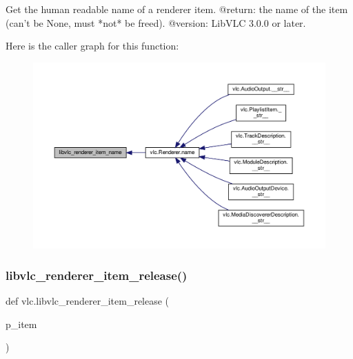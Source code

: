 \begin{DoxyVerb}Get the human readable name of a renderer item.
@return: the name of the item (can't be None, must *not* be freed).
@version: LibVLC 3.0.0 or later.
\end{DoxyVerb}
 Here is the caller graph for this function\+:
\nopagebreak
\begin{figure}[H]
\begin{center}
\leavevmode
\includegraphics[width=350pt]{namespacevlc_af07b197185f16792044c2e60d04dc412_icgraph}
\end{center}
\end{figure}
\mbox{\label{namespacevlc_a5086523148dd38cc9d179a9cbf9e47b1}} 
\subsubsection{\texorpdfstring{libvlc\+\_\+renderer\+\_\+item\+\_\+release()}{libvlc\_renderer\_item\_release()}}
{\footnotesize\ttfamily def vlc.\+libvlc\+\_\+renderer\+\_\+item\+\_\+release (\begin{DoxyParamCaption}\item[{}]{p\+\_\+item }\end{DoxyParamCaption})}


